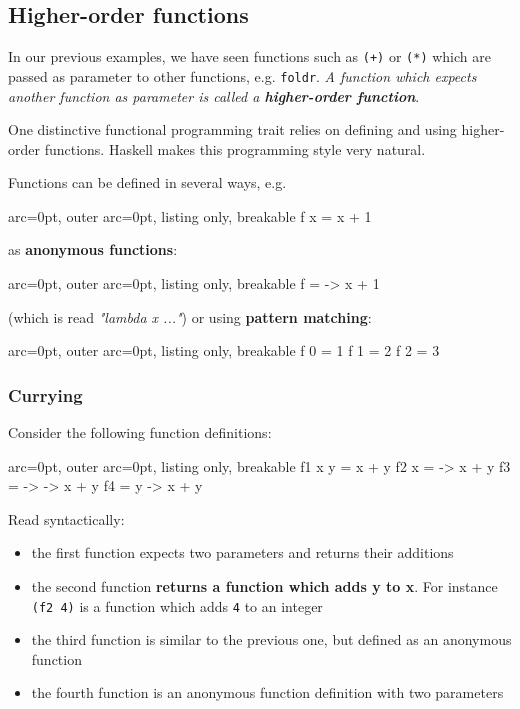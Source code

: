 
\subsection*{ Higher-order functions }

In our previous examples, we have seen functions such as \texttt{(+)} or \texttt{(*)} which are passed as parameter to other functions, e.g. \texttt{foldr}. \textit{A function which expects another function as parameter is called a \textbf{higher-order function}}.

One distinctive functional programming trait relies on defining and using higher-order functions. Haskell makes this programming style very natural.

Functions can be defined in several ways, e.g.

\begin{tcblisting}{ arc=0pt, outer arc=0pt, listing only, breakable}
f x = x + 1

\end{tcblisting}

as \textbf{anonymous functions}:

\begin{tcblisting}{ arc=0pt, outer arc=0pt, listing only, breakable}
f = \x -> x + 1

\end{tcblisting}

(which is read \textit{"lambda x ..."}) or using \textbf{pattern matching}:

\begin{tcblisting}{ arc=0pt, outer arc=0pt, listing only, breakable}
f 0 = 1
f 1 = 2
f 2 = 3

\end{tcblisting}


\subsubsection*{ Currying }

Consider the following function definitions:

\begin{tcblisting}{ arc=0pt, outer arc=0pt, listing only, breakable}
f1 x y = x + y
f2 x = \y -> x + y
f3 = \x -> \y -> x + y
f4 = \x y -> x + y

\end{tcblisting}


Read syntactically:
\begin{itemize}
	\item  the first function expects two parameters and returns their additions
	\item  the second function \textbf{returns a function which adds y to x}. For instance \texttt{(f2 4)} is a function which adds \texttt{4} to an integer
	\item  the third function is similar to the previous one, but defined as an anonymous function
	\item  the fourth function is an anonymous function definition with two parameters
\end{itemize}

